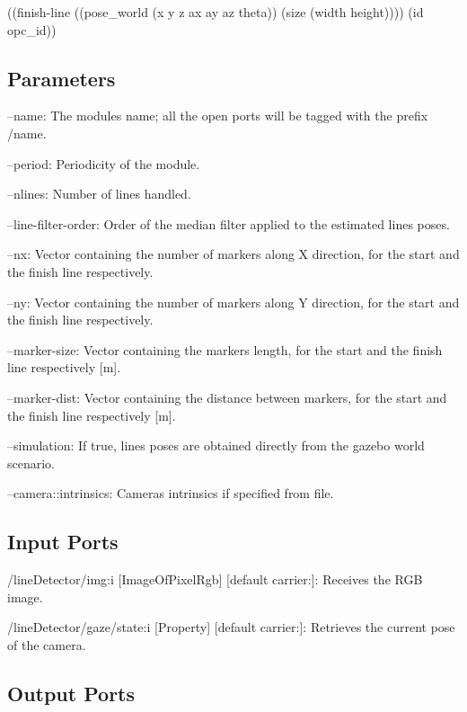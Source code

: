 \begin{DoxyCode}
((finish-line ((pose\_world (x y z ax ay az theta)) (size (width height)))) (\textcolor{keywordtype}{id} opc\_id))
\end{DoxyCode}
\hypertarget{group__skeletonViewer_parameters_sec}{}\subsection{Parameters}\label{group__skeletonViewer_parameters_sec}

\begin{DoxyItemize}
\item --name\+: The module\textquotesingle{}s name; all the open ports will be tagged with the prefix /name.
\item --period\+: Periodicity of the module.
\item --nlines\+: Number of lines handled.
\item --line-\/filter-\/order\+: Order of the median filter applied to the estimated lines poses.
\item --nx\+: Vector containing the number of markers along X direction, for the start and the finish line respectively.
\item --ny\+: Vector containing the number of markers along Y direction, for the start and the finish line respectively.
\item --marker-\/size\+: Vector containing the marker\textquotesingle{}s length, for the start and the finish line respectively \mbox{[}m\mbox{]}.
\item --marker-\/dist\+: Vector containing the distance between markers, for the start and the finish line respectively \mbox{[}m\mbox{]}.
\item --simulation\+: If true, lines poses are obtained directly from the gazebo world scenario.
\item --camera\+::intrinsics\+: Camera\textquotesingle{}s intrinsics if specified from file. 
\end{DoxyItemize}\hypertarget{group__skeletonViewer_inputports_sec}{}\subsection{Input Ports}\label{group__skeletonViewer_inputports_sec}

\begin{DoxyItemize}
\item /line\+Detector/img\+:i \mbox{[}Image\+Of\+Pixel\+Rgb\mbox{]} \mbox{[}default carrier\+:\mbox{]}\+: Receives the R\+GB image.
\item /line\+Detector/gaze/state\+:i \mbox{[}Property\mbox{]} \mbox{[}default carrier\+:\mbox{]}\+: Retrieves the current pose of the camera.
\end{DoxyItemize}\hypertarget{group__skeletonViewer_outputports_sec}{}\subsection{Output Ports}\label{group__skeletonViewer_outputports_sec}

